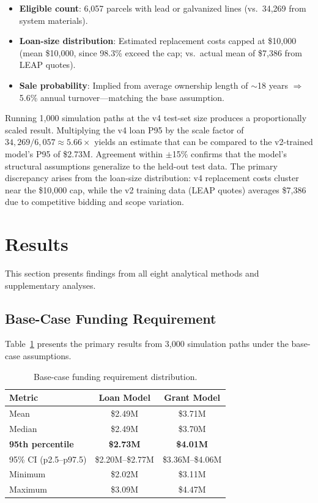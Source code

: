 \documentclass[11pt, letterpaper]{article}
\begin{document}
\begin{itemize}[nosep]
  \item \textbf{Eligible count}: 6{,}057 parcels with lead or galvanized lines (vs.\ 34{,}269 from system materials).
  \item \textbf{Loan-size distribution}: Estimated replacement costs capped at \$10{,}000 (mean \$10{,}000, since 98.3\% exceed the cap; vs.\ actual mean of \$7{,}386 from LEAP quotes).
  \item \textbf{Sale probability}: Implied from average ownership length of ${\sim}$18 years $\Rightarrow$ 5.6\% annual turnover---matching the base assumption.
\end{itemize}

Running 1{,}000 simulation paths at the v4 test-set size produces a proportionally scaled result. Multiplying the v4 loan P95 by the scale factor of $34{,}269 / 6{,}057 \approx 5.66\times$ yields an estimate that can be compared to the v2-trained model's P95 of \$2.73M. Agreement within ${\pm}$15\% confirms that the model's structural assumptions generalize to the held-out test data. The primary discrepancy arises from the loan-size distribution: v4 replacement costs cluster near the \$10{,}000 cap, while the v2 training data (LEAP quotes) averages \$7{,}386 due to competitive bidding and scope variation.

\section{Results}
\label{sec:results}

This section presents findings from all eight analytical methods and supplementary analyses.

\subsection{Base-Case Funding Requirement}

Table~\ref{tab:base_results} presents the primary results from 3{,}000 simulation paths under the base-case assumptions.

\begin{table}[H]
  \centering
  \caption{Base-case funding requirement distribution.}
  \label{tab:base_results}
  \begin{tabular}{@{}lcc@{}}
    \toprule
    \textbf{Metric} & \textbf{Loan Model} & \textbf{Grant Model} \\
    \midrule
    Mean & \$2.49M & \$3.71M \\
    Median & \$2.49M & \$3.70M \\
    \textbf{95th percentile} & \textbf{\$2.73M} & \textbf{\$4.01M} \\
    95\% CI (p2.5--p97.5) & \$2.20M--\$2.77M & \$3.36M--\$4.06M \\
    Minimum & \$2.02M & \$3.11M \\
    Maximum & \$3.09M & \$4.47M \\
    \bottomrule
  \end{tabular}
\end{table}
\end{document}
